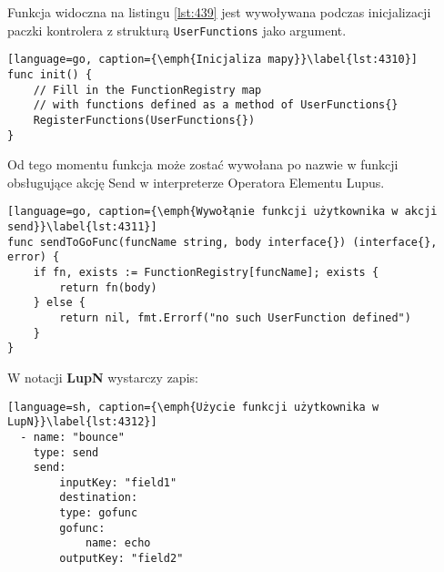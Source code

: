 Funkcja widoczna na listingu \ref{lst:439} jest wywoływana podczas inicjalizacji paczki kontrolera z strukturą \texttt{UserFunctions} jako argument.

\begin{lstlisting}[language=go, caption={\emph{Inicjaliza mapy}}\label{lst:4310}]
func init() {
	// Fill in the FunctionRegistry map 
	// with functions defined as a method of UserFunctions{}
	RegisterFunctions(UserFunctions{})
}
\end{lstlisting}


Od tego momentu funkcja może zostać wywołana po nazwie w funkcji obsługujące akcję Send w interpreterze Operatora Elementu Lupus.

\begin{lstlisting}[language=go, caption={\emph{Wywołąnie funkcji użytkownika w akcji send}}\label{lst:4311}]
func sendToGoFunc(funcName string, body interface{}) (interface{}, error) {
	if fn, exists := FunctionRegistry[funcName]; exists {
		return fn(body)
	} else {
		return nil, fmt.Errorf("no such UserFunction defined")
	}
}
\end{lstlisting}

W notacji \textbf{LupN} wystarczy zapis:

\begin{lstlisting}[language=sh, caption={\emph{Użycie funkcji użytkownika w LupN}}\label{lst:4312}]
  - name: "bounce"
    type: send
    send:
        inputKey: "field1"
        destination:
        type: gofunc
        gofunc:
            name: echo
        outputKey: "field2"
\end{lstlisting}